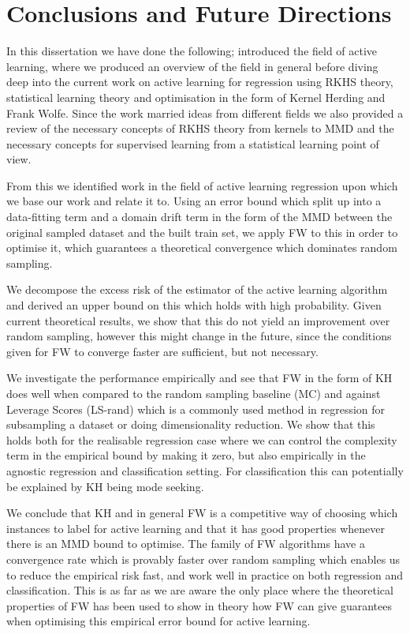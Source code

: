 \chapter{Conclusions and Future Directions}
\label{ch:conclusions}


In this dissertation we have done the following; introduced the field of active
learning, where we produced an overview of the field in general before diving
deep into the current work on active learning for regression using RKHS theory,
statistical learning theory and optimisation in the form of Kernel Herding and
Frank Wolfe. Since the work married ideas from different fields we also provided
a review of the necessary concepts of RKHS theory from kernels to MMD and the
necessary concepts for supervised learning from a statistical learning point of view.

From this we identified work in the field of active learning
regression upon which we base our work and relate it to. Using an error bound
which split up into a data-fitting term and a domain drift term in the form of
the MMD between the original sampled dataset and the built train set, we apply
FW to this in order to optimise it, which guarantees a theoretical convergence
which dominates random sampling.

We decompose the excess risk of the estimator of the active learning
algorithm and derived an upper bound on this which holds with high probability.
Given current theoretical results, we show that this do not yield an
improvement over random sampling, however this might change in the future, since
the conditions given for FW to converge faster are sufficient, but not
necessary.

We investigate the performance empirically and see that FW in the form of KH
does well when compared to the random sampling baseline (MC) and against
Leverage Scores (LS-rand) which is a commonly used method in regression for subsampling a
dataset or doing dimensionality reduction. We show that this holds both for the
realisable regression case where we can control the complexity term in the empirical bound
by making it zero, but also empirically in the agnostic regression and classification
setting. For classification this can potentially be explained by KH being mode seeking.

We conclude that KH and in general FW is a competitive way of choosing which
instances to label for active learning and that it has good properties whenever
there is an MMD bound to optimise. The family of FW algorithms have a convergence rate which is
provably faster over random sampling which enables us to reduce the empirical
risk fast, and work well in practice on both regression and classification. This
is as far as we are aware the only place where the theoretical properties of FW
has been used to show in theory how FW can give guarantees when optimising this
empirical error bound for active learning.

